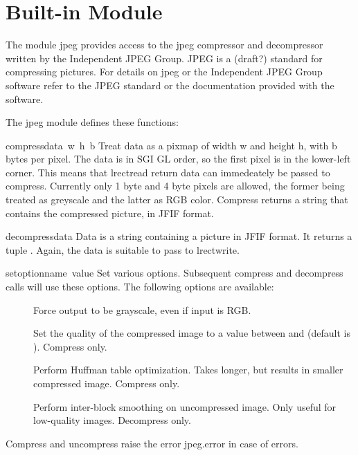 \section{Built-in Module }

The module jpeg provides access to the jpeg compressor and
decompressor written by the Independent JPEG Group. JPEG is a (draft?)
standard for compressing pictures.  For details on jpeg or the
Independent JPEG Group software refer to the JPEG standard or the
documentation provided with the software.

The jpeg module defines these functions:

\renewcommand{\indexsubitem}{(in module jpeg)}
\begin{funcdesc}{compress}{data\, w\, h\, b}
Treat data as a pixmap of width w and height h, with b bytes per
pixel.  The data is in SGI GL order, so the first pixel is in the
lower-left corner. This means that lrectread return data can
immedeately be passed to compress.  Currently only 1 byte and 4 byte
pixels are allowed, the former being treated as greyscale and the
latter as RGB color.  Compress returns a string that contains the
compressed picture, in JFIF format.
\end{funcdesc}

\begin{funcdesc}{decompress}{data}
Data is a string containing a picture in JFIF format. It returns a
tuple
.
Again, the data is suitable to pass to lrectwrite.
\end{funcdesc}

\begin{funcdesc}{setoption}{name\, value}
Set various options.  Subsequent compress and decompress calls
will use these options.  The following options are available:
\begin{description}
\item[]
Force output to be grayscale, even if input is RGB.

\item[]
Set the quality of the compressed image to a
value between  and  (default is ).  Compress only.

\item[]
Perform Huffman table optimization.  Takes longer, but results in
smaller compressed image.  Compress only.

\item[]
Perform inter-block smoothing on uncompressed image.  Only useful for
low-quality images.  Decompress only.
\end{description}
\end{funcdesc}

Compress and uncompress raise the error jpeg.error in case of errors.
